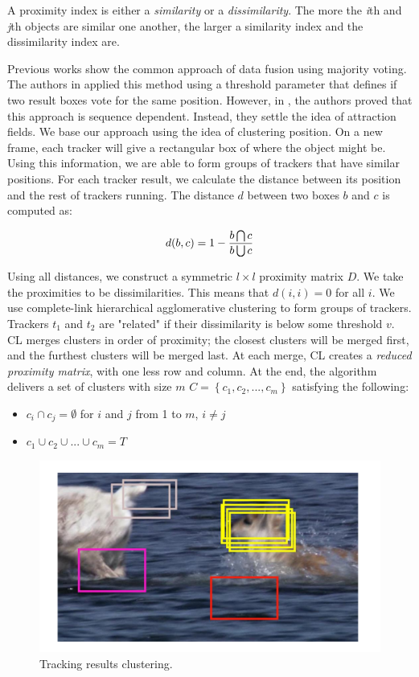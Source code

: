 A proximity index is either a \textit{similarity} or a \textit{dissimilarity}. The more the \textit{i}th and \textit{j}th objects are similar one another, the larger a similarity index and the dissimilarity index are.

Previous works show the common approach of data fusion using majority voting. The authors in \cite{Bailer2013} applied this method using a threshold parameter that defines if two result boxes vote for the same position. However, in \cite{Bailer2014}, the authors proved that this approach is sequence dependent. Instead, they settle the idea of attraction fields. We base our approach using the idea of clustering position. On a new frame, each tracker will give a rectangular box of where the object might be. Using this information, we are able to form groups of trackers that have similar positions. For each tracker result, we calculate the distance between its position and the rest of trackers running. The distance $d$ between two boxes $b$ and $c$ is computed as:

\begin{equation}
\large
d(b,c) = 1 - \frac{b\bigcap c}{b\bigcup  c}
\end{equation}

Using all distances, we construct a symmetric $l \times l$ proximity matrix $D$. We take the proximities to be dissimilarities. This means that $d(i,i) = 0$ for all $i$. We use complete-link hierarchical agglomerative clustering to form groups of trackers. Trackers $t_1$ and $t_2$ are "related" if their dissimilarity is below some threshold $v$. CL merges clusters in order of proximity; the closest clusters will be merged first, and the furthest clusters will be merged last. At each merge, CL creates a \textit{reduced proximity matrix}, with one less row and column. At the end, the algorithm delivers a set of clusters with size $m$ $C = \left \{ c_1, c_2, ..., c_m \right \}$ satisfying the following:
\begin{itemize}
\item $c_i \cap c_j = \emptyset$ for $i$ and $j$ from 1 to $m$, $i \neq j$
\item $c_1 \cup c_2 \cup ... \cup c_m = T$
\end{itemize}

\begin{figure}[t!]
	\centering
		\includegraphics[width=0.65\linewidth, trim= 1cm 1cm 1cm 1cm, clip=true]{Figures/trackers_clustering.pdf}
	\caption{Tracking results clustering.}
	\label{fig::trackers_clustering}
\end{figure}

